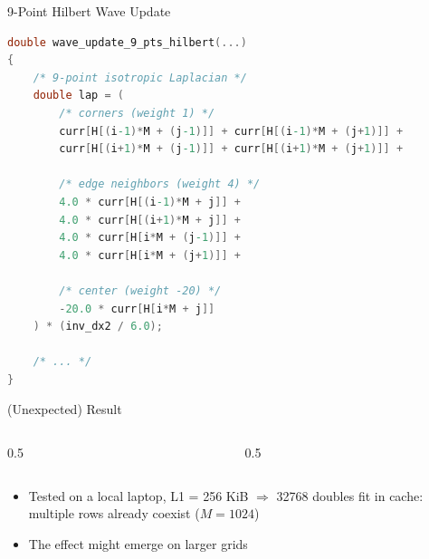 \documentclass[11pt,aspectratio=169]{beamer}
\begin{document}
\begin{frame}[fragile]{9-Point Hilbert Wave Update}
  \scriptsize
\begin{lstlisting}[language=C]
double wave_update_9_pts_hilbert(...)
{
    /* 9-point isotropic Laplacian */
    double lap = (
        /* corners (weight 1) */
        curr[H[(i-1)*M + (j-1)]] + curr[H[(i-1)*M + (j+1)]] +
        curr[H[(i+1)*M + (j-1)]] + curr[H[(i+1)*M + (j+1)]] +

        /* edge neighbors (weight 4) */
        4.0 * curr[H[(i-1)*M + j]] +
        4.0 * curr[H[(i+1)*M + j]] +
        4.0 * curr[H[i*M + (j-1)]] +
        4.0 * curr[H[i*M + (j+1)]] +

        /* center (weight -20) */
        -20.0 * curr[H[i*M + j]]
    ) * (inv_dx2 / 6.0);

    /* ... */
}
\end{lstlisting}
\end{frame}

\begin{frame}{(Unexpected) Result}

  \begin{columns}
    \begin{column}{0.5\textwidth}
      \begin{figure}
        \centering
        \scalebox{0.7}{}
      \end{figure}

    \end{column}

    \begin{column}{0.5\textwidth}
      \begin{figure}
        \centering
        \scalebox{0.7}{}
      \end{figure}

    \end{column}
  \end{columns}
  \vspace{10pt}
  \begin{itemize}
    \item Tested on a local laptop, L1 = 256 KiB $\Rightarrow$ 32768
      doubles fit in cache: multiple rows already coexist ($M = 1024$)
    \item The effect might emerge on larger grids
  \end{itemize}

\end{frame}
\end{document}
